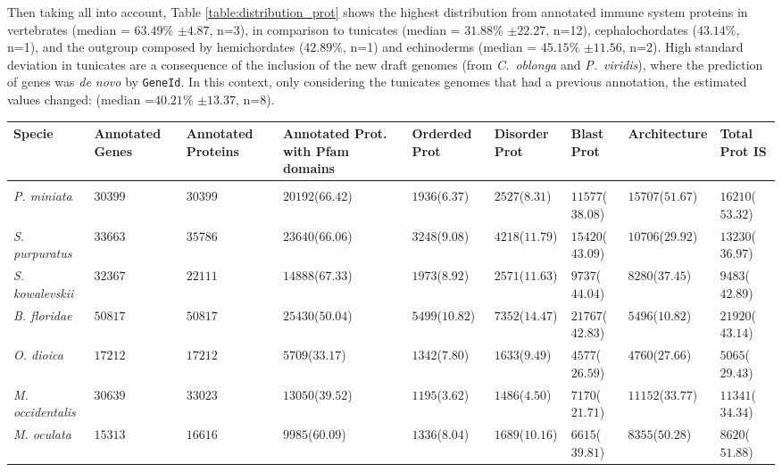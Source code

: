 \documentclass[11pt]{article}
\begin{document}
Then taking all into account, Table \ref{table:distribution_prot} shows the 
highest distribution from annotated immune system proteins in vertebrates 
(median = $63.49$\% $\pm 4.87$, n=3), in comparison to tunicates 
(median = $31.88$\% $\pm 22.27$, n=12), cephalochordates ($43.14$\%, n=1), and the
outgroup composed by hemichordates ($42.89$\%, n=1) and echinoderms 
(median = $45.15$\% $\pm 11.56$, n=2). High standard deviation in tunicates are 
a consequence of the inclusion of the new draft genomes (from \textit{C.\ oblonga} 
and \textit{P.\ viridis}), where the prediction of genes was \textsl{de novo} 
by \texttt{GeneId}. In this context, only considering the tunicates genomes that 
had a previous annotation, the estimated values changed: (median =$40.21$\% $\pm 13.37$, n=8).

\begin{table}
\small
\centering
\begin{tabular}{p{3.2cm}p{2cm}p{2cm}p{2cm}p{2cm}p{2cm}p{2cm}p{2.7cm}p{2.6cm}}
\toprule
\textbf{Specie}&\textbf{Annotated Genes}&\textbf{Annotated 
Proteins}&\textbf{Annotated Prot. with Pfam domains}&\textbf{Orderded 
Prot}&\textbf{Disorder Prot}&\textbf{Blast 
Prot}&\textbf{Architecture}&\textbf{Total Prot IS} \\ 
\midrule \\
\textsl{P. miniata}&    
$30399$&$30399$&$20192$($66.42$)&$1936$($6.37$)&$2527$($8.31$)&$11577$($38.08$)&
$15707$($51.67$)&$16210$($53.32$)\\
\textsl{S. purpuratus}& 
$33663$&$35786$&$23640$($66.06$)&$3248$($9.08$)&$4218$($11.79$)&$15420$($43.09$)
&$10706$($29.92$)&$13230$($36.97$)\\
\textsl{S. kowalevskii}&        
$32367$&$22111$&$14888$($67.33$)&$1973$($8.92$)&$2571$($11.63$)&$9737$($44.04$)&
$8280$($37.45$)&$9483$($42.89$)\\
\midrule
\textsl{B. floridae}&   $50817$&$50817$&$25430$($50.04$)&$5499$($10.82$)&$7352$($14.47$)&$21767$($
42.83$)&$5496$($10.82$)&$21920$($43.14$)\\
\textsl{O. dioica}&$17212$&$17212$&$5709$($33.17$)&$1342$($7.80$)&$1633$($9.49$)&$4577$($26.5
9$)&$4760$($27.66$)&$5065$($29.43$)\\
\textsl{M. occidentalis}&       
$30639$&$33023$&$13050$($39.52$)&$1195$($3.62$)&$1486$($4.50$)&$7170$($21.71$)&$
11152$($33.77$)&$11341$($34.34$)\\
\textsl{M. oculata}&    
$15313$&$16616$&$9985$($60.09$)&$1336$($8.04$)&$1689$($10.16$)&$6615$($39.81$)&$
8355$($50.28$)&$8620$($51.88$)\\

\end{tabular}
\end{table}
\end{document}
